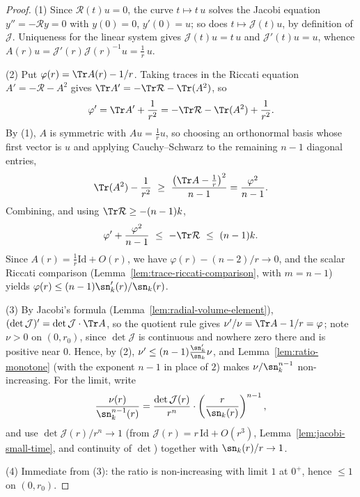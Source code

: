 \begin{proof}
\leanok
(1) Since $\mathcal R(t)u=0$, the curve $t\mapsto t\,u$ solves the Jacobi
equation $y''=-\mathcal R y=0$ with $y(0)=0$, $y'(0)=u$; so does
$t\mapsto\mathcal J(t)u$, by definition of $\mathcal J$. Uniqueness for the
linear system gives $\mathcal J(t)u=t\,u$ and $\mathcal J'(t)u=u$, whence
$A(r)u=\mathcal J'(r)\mathcal J(r)^{-1}u=\tfrac1r\,u$.

(2) Put $\varphi(r)=\Tr A(r)-1/r$. Taking traces in the Riccati equation
$A'=-\mathcal R-A^2$ gives $\Tr A'=-\Tr\mathcal R-\Tr(A^2)$, so
$$\varphi'=\Tr A'+\frac1{r^2}
=-\Tr\mathcal R-\Tr(A^2)+\frac1{r^2}.$$
By (1), $A$ is symmetric with $Au=\tfrac1r u$, so choosing an orthonormal
basis whose first vector is $u$ and applying Cauchy--Schwarz to the remaining
$n-1$ diagonal entries,
$$\Tr(A^2)-\frac1{r^2}\ \ge\ \frac{\left(\Tr A-\tfrac1r\right)^2}{n-1}
=\frac{\varphi^2}{n-1}.$$
Combining, and using $\Tr\mathcal R\ge-(n-1)k$,
$$\varphi'+\frac{\varphi^2}{n-1}\ \le\ -\Tr\mathcal R\ \le\ (n-1)k .$$
Since $A(r)=\tfrac1r\mathrm{Id}+O(r)$, we have $\varphi(r)-(n-2)/r\to 0$, and
the scalar Riccati comparison (Lemma~\ref{lem:trace-riccati-comparison}, with
$m=n-1$) yields $\varphi(r)\le(n-1)\sn_k'(r)/\sn_k(r)$.

(3) By Jacobi's formula (Lemma~\ref{lem:radial-volume-element}),
$(\det\mathcal J)'=\det\mathcal J\cdot\Tr A$, so the quotient rule gives
$\nu'/\nu=\Tr A-1/r=\varphi$; note $\nu>0$ on $(0,r_0)$, since
$\det\mathcal J$ is continuous and nowhere zero there and is positive near
$0$. Hence, by (2), $\nu'\le(n-1)\frac{\sn_k'}{\sn_k}\nu$, and
Lemma~\ref{lem:ratio-monotone} (with the exponent $n-1$ in place of $2$)
makes $\nu/\sn_k^{n-1}$ non-increasing. For the limit, write
$$\frac{\nu(r)}{\sn_k^{n-1}(r)}
=\frac{\det\mathcal J(r)}{r^{n}}\cdot
\left(\frac{r}{\sn_k(r)}\right)^{n-1},$$
and use $\det\mathcal J(r)/r^{n}\to1$ (from $\mathcal J(r)=r\,\mathrm{Id}+O(r^3)$,
Lemma~\ref{lem:jacobi-small-time}, and continuity of $\det$) together with
$\sn_k(r)/r\to1$.

(4) Immediate from (3): the ratio is non-increasing with limit $1$ at $0^+$,
hence $\le1$ on $(0,r_0)$.
\end{proof}


